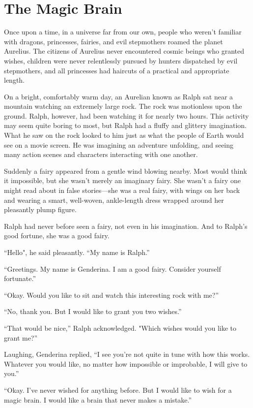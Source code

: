 \chapter{The Magic Brain}

Once upon a time, in a universe far from our own, people who weren't familiar with dragons, princesses, fairies, and evil stepmothers roamed the planet Aurelius. The citizens of Aurelius never encountered cosmic beings who granted wishes, children were never relentlessly pursued by hunters dispatched by evil stepmothers, and all princesses had haircuts of a practical and appropriate length.

On a bright, comfortably warm day, an Aurelian known as Ralph sat near a mountain watching an extremely large rock. The rock was motionless upon the ground. Ralph, however, had been watching it for nearly two hours. This activity may seem quite boring to most, but Ralph had a fluffy and glittery imagination. What he saw on the rock looked to him just as what the people of Earth would see on a movie screen. He was imagining an adventure unfolding, and seeing many action scenes and characters interacting with one another.

Suddenly a fairy appeared from a gentle wind blowing nearby. Most would think it impossible, but she wasn't merely an imaginary fairy. She wasn't a fairy one might read about in false stories—she was a real fairy, with wings on her back and wearing a smart, well-woven, ankle-length dress wrapped around her pleasantly plump figure.

Ralph had never before seen a fairy, not even in his imagination. And to Ralph's good fortune, she was a good fairy.

“Hello", he said pleasantly. “My name is Ralph.”

“Greetings. My name is Genderina. I am a good fairy. Consider yourself fortunate.”

“Okay. Would you like to sit and watch this interesting rock with me?”

“No, thank you. But I would like to grant you two wishes.”

“That would be nice,” Ralph acknowledged. "Which wishes would you like to grant me?”

Laughing, Genderina replied, “I see you're not quite in tune with how this works. Whatever you would like, no matter how impossible or improbable, I will give to you.”

“Okay. I've never wished for anything before. But I would like to wish for a magic brain. I would like a brain that never makes a mistake.”

